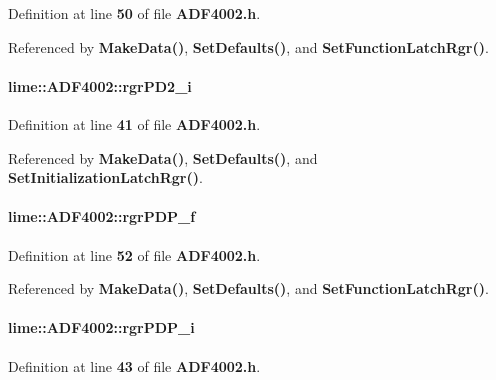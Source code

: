 Definition at line {\bf 50} of file {\bf A\+D\+F4002.\+h}.



Referenced by {\bf Make\+Data()}, {\bf Set\+Defaults()}, and {\bf Set\+Function\+Latch\+Rgr()}.

\paragraph[{rgr\+P\+D2\+\_\+i}]{ lime\+::\+A\+D\+F4002\+::rgr\+P\+D2\+\_\+i}\label{classlime_1_1ADF4002_a3646e247404852f8073e6910021c7988}


Definition at line {\bf 41} of file {\bf A\+D\+F4002.\+h}.



Referenced by {\bf Make\+Data()}, {\bf Set\+Defaults()}, and {\bf Set\+Initialization\+Latch\+Rgr()}.

\paragraph[{rgr\+P\+D\+P\+\_\+f}]{ lime\+::\+A\+D\+F4002\+::rgr\+P\+D\+P\+\_\+f}\label{classlime_1_1ADF4002_a9d73f9ebce9dfb4c81df8b02a9fd21fa}


Definition at line {\bf 52} of file {\bf A\+D\+F4002.\+h}.



Referenced by {\bf Make\+Data()}, {\bf Set\+Defaults()}, and {\bf Set\+Function\+Latch\+Rgr()}.

\paragraph[{rgr\+P\+D\+P\+\_\+i}]{ lime\+::\+A\+D\+F4002\+::rgr\+P\+D\+P\+\_\+i}\label{classlime_1_1ADF4002_af924979ee50eb19708d9e7ff454dfec5}


Definition at line {\bf 43} of file {\bf A\+D\+F4002.\+h}.



